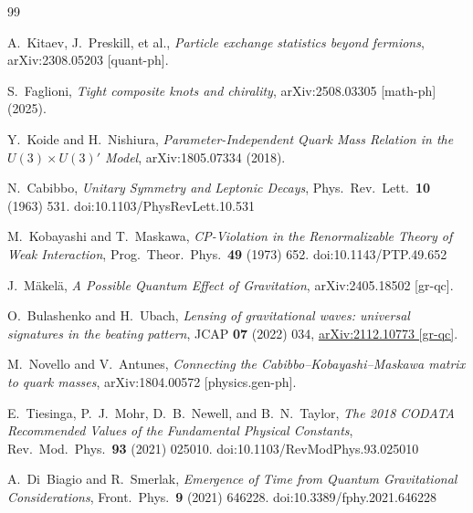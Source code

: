 \documentclass[11pt]{article}
\begin{document}
\begin{thebibliography}{99}

        A.~Kitaev, J.~Preskill, et al.,
        \emph{Particle exchange statistics beyond fermions},
        arXiv:2308.05203 [quant-ph].

        S.~Faglioni,
        \emph{Tight composite knots and chirality},
        arXiv:2508.03305 [math-ph] (2025).


        Y.~Koide and H.~Nishiura,
        \emph{Parameter-Independent Quark Mass Relation in the $U(3)\times U(3)'$ Model},
        arXiv:1805.07334 (2018).

        N.~Cabibbo,
        \emph{Unitary Symmetry and Leptonic Decays},
        Phys.\ Rev.\ Lett.\ \textbf{10} (1963) 531.
        doi:10.1103/PhysRevLett.10.531

        M.~Kobayashi and T.~Maskawa,
        \emph{CP-Violation in the Renormalizable Theory of Weak Interaction},
        Prog.\ Theor.\ Phys.\ \textbf{49} (1973) 652.
        doi:10.1143/PTP.49.652


        J.~M\"akel\"a,
        \emph{A Possible Quantum Effect of Gravitation},
        arXiv:2405.18502 [gr-qc].

        O.~Bulashenko and H.~Ubach,
        \emph{Lensing of gravitational waves: universal signatures in the beating pattern},
        JCAP \textbf{07} (2022) 034,
        \href{https://arxiv.org/abs/2112.10773}{arXiv:2112.10773 [gr-qc]}.


        M.~Novello and V.~Antunes,
        \emph{Connecting the Cabibbo--Kobayashi--Maskawa matrix to quark masses},
        arXiv:1804.00572 [physics.gen-ph].

        E.~Tiesinga, P.~J.~Mohr, D.~B.~Newell, and B.~N.~Taylor,
        \emph{The 2018 CODATA Recommended Values of the Fundamental Physical Constants},
        Rev.\ Mod.\ Phys.\ \textbf{93} (2021) 025010.
        doi:10.1103/RevModPhys.93.025010

        A.~Di~Biagio and R.~Smerlak,
        \emph{Emergence of Time from Quantum Gravitational Considerations},
        Front.\ Phys.\ \textbf{9} (2021) 646228.
        doi:10.3389/fphy.2021.646228



\end{thebibliography}
\end{document}
